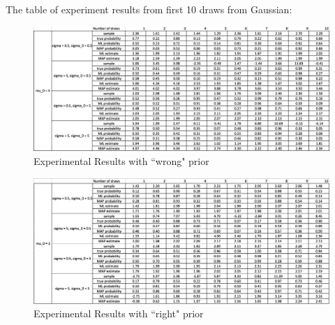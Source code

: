 \documentclass[a4paper]{article}
\begin{document}
\begin{spacing}{2.0}
\newpage
The table of experiment results from first 10 draws from Gaussian:
\begin{figure}[H]
\centering
\includegraphics[width = 7.5in]{exp1.jpg}
\caption{Experimental Results with ``wrong" prior}
\label{fig1}
\end{figure}

\begin{figure}[H]
\centering
\includegraphics[width = 7.5in]{exp2.jpg}
\caption{Experimental Results with ``right" prior}
\label{fig1}
\end{figure}


\end{spacing}
\end{document}
